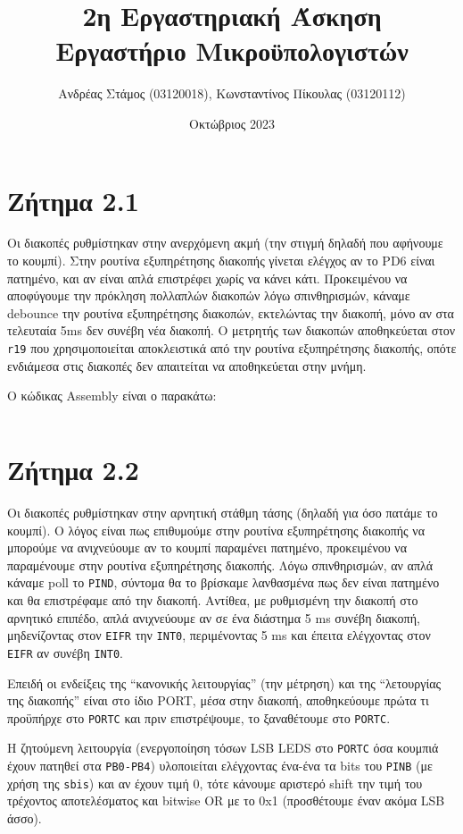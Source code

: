 \documentclass[a4paper]{article}
\title{2η Εργαστηριακή Άσκηση\\Εργαστήριο Μικροϋπολογιστών}
\author{Ανδρέας Στάμος (03120018), Κωνσταντίνος Πίκουλας (03120112)}
\date{Οκτώβριος 2023}
\begin{document}
\maketitle
\tableofcontents

\section{Ζήτημα 2.1}
Οι διακοπές ρυθμίστηκαν στην ανερχόμενη ακμή (την στιγμή δηλαδή που αφήνουμε το κουμπί). Στην ρουτίνα εξυπηρέτησης διακοπής
γίνεται ελέγχος αν το PD6 είναι πατημένο, και αν είναι απλά επιστρέφει χωρίς να κάνει κάτι. Προκειμένου να αποφύγουμε την πρόκληση πολλαπλών
διακοπών λόγω σπινθηρισμών, κάναμε debounce την ρουτίνα εξυπηρέτησης διακοπών, εκτελώντας την διακοπή, μόνο αν στα τελευταία 5ms δεν συνέβη νέα
διακοπή. Ο μετρητής των διακοπών αποθηκεύεται στον \texttt{r19} που χρησιμοποιείται αποκλειστικά από την ρουτίνα εξυπηρέτησης διακοπής, οπότε
ενδιάμεσα στις διακοπές δεν απαιτείται να αποθηκεύεται στην μνήμη.

Ο κώδικας Assembly είναι ο παρακάτω:
\inputminted[breaklines, linenos]{gas}{../Lab2.1/main_k.asm}


\section{Ζήτημα 2.2}
\par Οι διακοπές ρυθμίστηκαν στην αρνητική στάθμη τάσης (δηλαδή για όσο πατάμε το κουμπί). Ο λόγος είναι πως επιθυμούμε στην ρουτίνα εξυπηρέτησης
διακοπής να μπορούμε να ανιχνεύουμε αν το κουμπί παραμένει πατημένο, προκειμένου να παραμένουμε στην ρουτίνα εξυπηρέτησης διακοπής.
Λόγω σπινθηρισμών, αν απλά κάναμε poll το \texttt{PIND}, σύντομα θα το βρίσκαμε λανθασμένα πως δεν είναι πατημένο και θα επιστρέφαμε από την διακοπή.
Αντίθεα, με ρυθμισμένη την διακοπή στο αρνητικό επιπέδο, απλά ανιχνεύουμε αν σε ένα διάστημα 5 ms συνέβη διακοπή, μηδενίζοντας στον \texttt{EIFR}
την \texttt{INT0}, περιμένοντας 5 ms και έπειτα ελέγχοντας στον \texttt{EIFR} αν συνέβη \texttt{INT0}.

\par Επειδή οι ενδείξεις της ``κανονικής λειτουργίας'' (την μέτρηση) και της ``λετουργίας της διακοπής'' είναι στο ίδιο PORT,
μέσα στην διακοπή, αποθηκεύουμε πρώτα τι προϋπήρχε στο \texttt{PORTC} και πριν επιστρέψουμε, το ξαναθέτουμε στο \texttt{PORTC}.

\par Η ζητούμενη λειτουργία (ενεργοποίηση τόσων LSB LEDS στο \texttt{PORTC} όσα κουμπιά έχουν πατηθεί στα \texttt{PB0-PB4}) υλοποιείται
ελέγχοντας ένα-ένα τα bits του \texttt{PINB} (με χρήση της \texttt{sbis}) και αν έχουν τιμή 0, τότε κάνουμε αριστερό shift την τιμή του
τρέχοντος αποτελέσματος και bitwise OR με το 0x1 (προσθέτουμε έναν ακόμα LSB άσσο).
\end{document}
